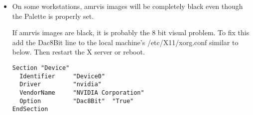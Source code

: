 \documentclass{article}
\begin{document}
\begin{itemize}
\item On some workstations, amrvis images will be completely black 
even though the Palette is properly set.

If amrvis images are black, it is probably the 8 bit visual problem.
To fix this add the Dac8Bit line to the local machine's /etc/X11/xorg.conf
similar to below.  Then restart the X server or reboot.

\begin{verbatim}
Section "Device"
  Identifier     "Device0"
  Driver         "nvidia"
  VendorName     "NVIDIA Corporation"
  Option         "Dac8Bit"  "True"
EndSection
\end{verbatim}


\end{itemize}
\end{document}
